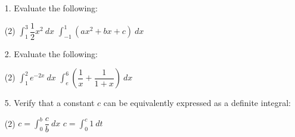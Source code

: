 \documentclass{./../../Latex/homework}
\begin{document}
\begin{enumerate}

\item[1.] Evaluate the following:
\begin{tasks}(2)
\task[(a)] $ \displaystyle\int_1^3 \dfrac{1}{2}x^2 \ dx $
\task[(e)] $ \displaystyle\int_{-1}^1 (ax^2 + bx +c)\ dx $
\end{tasks}

\newpage
\item[2.] Evaluate the following:
\begin{tasks}(2)
\task[(a)] $ \displaystyle\int_1^2 e^{-2x} \ dx $
\task[(d)] $ \displaystyle\int_e^6 \left( \dfrac{1}{x} +\dfrac{1}{1+x} \right) \ dx  $
\end{tasks}

\item[5.] Verify that a constant $c$ can be equivalently expressed as a definite integral:
\begin{tasks}(2)
\task $ c = \displaystyle\int_0^b \dfrac{c}{b}\ dx	$
\task $ c = \displaystyle\int_0^c 1\ dt	$
\end{tasks}

\end{enumerate}
\end{document}
